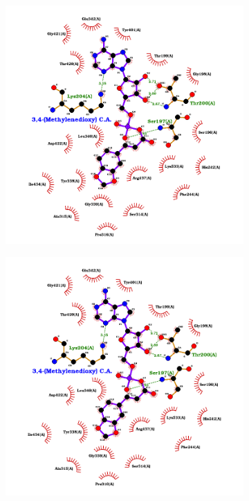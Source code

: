 \documentclass[12pt]{article}
\begin{document}
\begin{figure}[h]
\begin{subfigure}[h!]{0.35\textwidth}
			\caption{}
		\end{subfigure}
		\hfill
		\begin{subfigure}[h!]{0.35\textwidth}
			\hspace{2cm}
			\includegraphics[width=\textwidth]{../6/propose/Dock/best3.png}
			\caption{}
		\end{subfigure}
		\hfill
		\begin{subfigure}[h!]{0.35\textwidth}
			\hspace{-2cm}
			\includegraphics[width=\textwidth]{../6/propose/Dock/best4.png}

\end{subfigure}
\end{figure}
\end{document}

